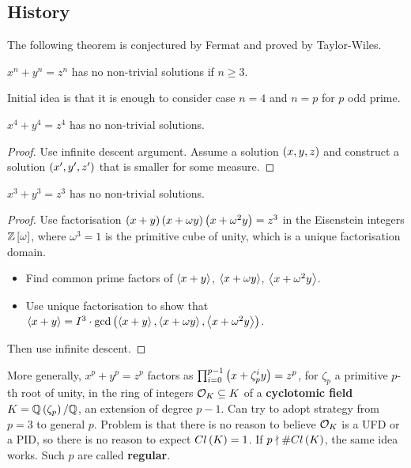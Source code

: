 \subsection{History}

The following theorem is conjectured by Fermat and proved by Taylor-Wiles.

\begin{theorem}
$ x^n + y^n = z^n $ has no non-trivial solutions if $ n \ge 3 $.
\end{theorem}

Initial idea is that it is enough to consider case $ n = 4 $ and $ n = p $ for $ p $ odd prime.

\begin{theorem}[Fermat]
$ x^4 + y^4 = z^4 $ has no non-trivial solutions.
\end{theorem}

\begin{proof}
Use infinite descent argument. Assume a solution $ \left( x, y, z \right) $ and construct a solution $ \left( x', y', z' \right) $ that is smaller for some measure.
\end{proof}

\begin{theorem}[Euler]
$ x^3 + y^3 = z^3 $ has no non-trivial solutions.
\end{theorem}

\begin{proof}
Use factorisation $ \left( x + y \right)\left( x + \omega y \right)\left( x + \omega^2y \right) = z^3 $ in the Eisenstein integers $ \mathbb{Z}\left[ \omega \right] $, where $ \omega^3 = 1 $ is the primitive cube of unity, which is a unique factorisation domain.
\begin{itemize}
\item Find common prime factors of $ \left\langle x + y \right\rangle $, $ \left\langle x + \omega y \right\rangle $, $ \left\langle x + \omega^2y \right\rangle $.
\item Use unique factorisation to show that $ \left\langle x + y \right\rangle = I^3 \cdot \gcd\left( \left\langle x + y \right\rangle, \left\langle x + \omega y \right\rangle, \left\langle x + \omega^2y \right\rangle \right) $.
\end{itemize}
Then use infinite descent.
\end{proof}

More generally, $ x^p + y^p = z^p $ factors as $ \prod_{i = 0}^{p - 1} \left( x + \zeta_p^iy \right) = z^p $, for $ \zeta_p $ a primitive $ p $-th root of unity, in the ring of integers $ \mathcal{O}_K \subseteq K $ of a \textbf{cyclotomic field} $ K = \mathbb{Q}\left( \zeta_p \right) / \mathbb{Q} $, an extension of degree $ p - 1 $. Can try to adopt strategy from $ p = 3 $ to general $ p $. Problem is that there is no reason to believe $ \mathcal{O}_K $ is a UFD or a PID, so there is no reason to expect $ Cl\left( K \right) = 1 $. If $ p \nmid \#Cl\left( K \right) $, the same idea works. Such $ p $ are called \textbf{regular}.

